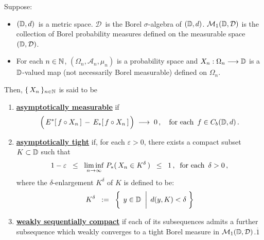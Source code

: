 \begin{definition}
\mbox{}\vskip 0.1cm
\noindent
Suppose:
\begin{itemize}
\item
	$(\mathbb{D},d)$\, is a metric space.
	$\mathcal{D}$\, is the Borel $\sigma$-algebra of $(\mathbb{D},d)$.
	\vskip 0.0cm
	$\mathcal{M}_{1}(\mathbb{D},\mathcal{D})$ is the collection of Borel probability measures
	defined on the measurable space $(\mathbb{D},\mathcal{D})$.
\item
	For each $n \in \mathbb{N}$,
	$(\Omega_{n},\mathcal{A}_{n},\mu_{n})$ is a probability space and
	$X_{n} : \Omega_{n} \longrightarrow \mathbb{D}$
	is a $\mathbb{D}$-valued map (not necessarily Borel measurable) defined on $\Omega_{n}$.
\end{itemize}
Then, $\{\,X_{n}\,\}_{n\in\mathbb{N}}$ is said to be
\begin{enumerate}
\item
	\underline{\textbf{asymptotically measurable}}\; if
	\begin{equation*}
	\left(\, \overset{{\color{white}.}}{E^{*}}\!\left[\,f \circ X_{n}\,\right] \,-\, E_{*}\!\left[\,f \circ X_{n}\,\right] \,\right)
	\;\longrightarrow\;
	0\,,
	\quad
	\textnormal{for each \,$f \in C_{b}(\D,d)$}\,.
	\end{equation*}
\item
	\underline{\textbf{asymptotically tight}}\; if, for each $\varepsilon > 0$, there exists
	a compact subset $K \subset \mathbb{D}$ such that
	\begin{equation*}
	1 - \varepsilon
	\;\; \leq \;\; \underset{n\rightarrow\infty}{\liminf}\; P_{*}(\,X_{n} \in K^{\delta}\,)
	\;\; \leq \;\; 1\,,
	\;\;
	\textnormal{for each \,$\delta > 0$}\,,
	\end{equation*}
	where the $\delta$-enlargement $K^{\delta}$ of $K$ is defined to be:
	\begin{equation*}
	K^{\delta}
		\;\; := \;\;
		\left\{\;
		\left.
		y \overset{{\color{white}-}}{\in} \D
		\;\;\right\vert\;
		d(y,K) < \delta
		\;\right\}
	\end{equation*}
\item
	\underline{\textbf{weakly sequentially compact}}\; if each of its subsequences
	admits a further subsequence which weakly converges to a {\color{red}tight}
	Borel measure in $\mathcal{M}_{1}(\mathbb{D},\mathcal{D})$.{\color{white}$\overset{.}{1}$}
\end{enumerate}
\end{definition}


